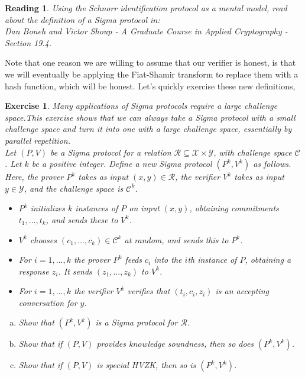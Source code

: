 \documentclass[12pt]{article}
\newtheorem{exercise}{Exercise}
\newtheorem{reading}{Reading}
\theoremstyle{definition}
\theoremstyle{remark}
\theoremstyle{definition}
\begin{document}
\begin{reading}
Using the Schnorr identification protocol as a mental model, read about the definition of a Sigma protocol in:\\
Dan Boneh and Victor Shoup - A Graduate Course in
Applied Cryptography - Section 19.4.
\end{reading}

Note that one reason we are willing to assume that our verifier is honest, is that we will eventually be applying the Fiat-Shamir transform to replace them with a hash function, which will be honest. Let's quickly exercise these new definitions,

\begin{exercise}
Many applications of Sigma protocols require a large challenge space.This exercise shows that we can always take a Sigma protocol with a small challenge space and turn it into one with a large challenge space, essentially by parallel repetition.\\
Let $(P, V)$ be a Sigma protocol for a relation $\mathcal{R}\subseteq \mathcal{X}\times\mathcal{Y}$, with challenge space $\mathcal{C}$. Let $k$ be a positive integer. Define a new Sigma protocol $(P^k, V^k)$ as follows. Here, the prover $P^k$ takes as input $(x, y)\in\mathcal{R}$, the verifier $V^k$ takes as input $y\in\mathcal{Y}$, and the challenge space is $\mathcal{C}^k$.
\begin{itemize}
\item $P^k$ initializes $k$ instances of $P$ on input $(x, y)$, obtaining commitments $t_1,\ldots, t_k$, and sends these to $V^k$.
\item $V^k$ chooses $(c_1,\ldots, c_k)\in\mathcal{C}^k$ at random, and sends this to $P^k$.
\item For $i=1,\ldots, k$ the prover $P^k$ feeds $c_i$ into the $i$th instance of $P$, obtaining a response $z_i$. It sends $(z_1,\ldots, z_k)$ to $V^k$.
\item For $i=1,\ldots, k$ the verifier $V^k$ verifies that $(t_i, c_i, z_i)$ is an accepting conversation for $y$.
\end{itemize}
\begin{enumerate}[(a)]
\item Show that $(P^k, V^k)$ is a Sigma protocol for $\mathcal{R}$.
\item Show that if $(P, V)$ provides knowledge soundness, then so does $(P^k, V^k)$.
\item Show that if $(P, V)$ is special HVZK, then so is $(P^k, V^k)$.
\end{enumerate}
\end{exercise}
\end{document}
